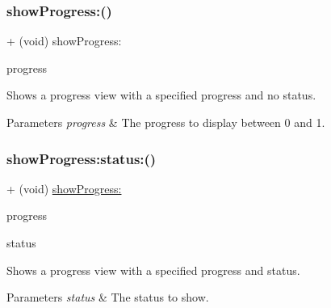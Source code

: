 \subsubsection{\texorpdfstring{show\+Progress\+:()}{showProgress:()}\hspace{0.1cm}{\footnotesize\ttfamily [3/3]}}
{\footnotesize\ttfamily + (void) show\+Progress\+: \begin{DoxyParamCaption}\item[{(C\+G\+Float)}]{progress }\end{DoxyParamCaption}}

Shows a progress view with a specified {\ttfamily progress} and no status. 
\begin{DoxyParams}{Parameters}
{\em progress} & The progress to display between 0 and 1. \\
\hline
\end{DoxyParams}
\mbox{\label{interface_k_v_n_progress_a2c58c4d42f018ef3efbb163f6390004e}} 
\subsubsection{\texorpdfstring{show\+Progress\+:status\+:()}{showProgress:status:()}\hspace{0.1cm}{\footnotesize\ttfamily [1/3]}}
{\footnotesize\ttfamily + (void) \mbox{\hyperlink{interface_k_v_n_progress_abc53102e1cb121a8b38c3337ce372517}{show\+Progress\+:}} \begin{DoxyParamCaption}\item[{(C\+G\+Float)}]{progress }\item[{status:(N\+S\+String $\ast$)}]{status }\end{DoxyParamCaption}}

Shows a progress view with a specified {\ttfamily progress} and {\ttfamily status}. 
\begin{DoxyParams}{Parameters}
{\em status} & The status to show. \\
\hline
\end{DoxyParams}
\mbox{\label{interface_k_v_n_progress_a2c58c4d42f018ef3efbb163f6390004e}} 
